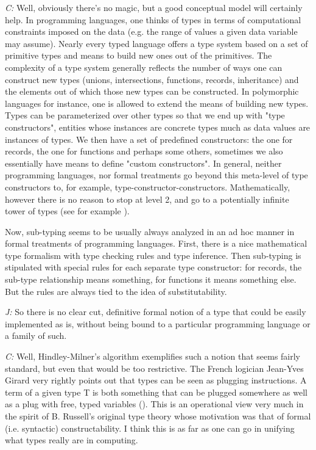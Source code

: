 \documentclass[10pt]{sigplanconf}
\begin{document}
\emph{C:} Well, obviously there's no magic, but a good conceptual model will certainly help. In programming languages, one thinks of types in terms of computational constraints imposed on the data (e.g. the range of values a given data variable may assume). Nearly every typed language offers a type system based on a set of primitive types and means to build new ones out of the primitives. The complexity of a type system generally reflects the number of ways one can construct new types (unions, intersections, functions, records, inheritance) and the elements out of which those new types can be constructed. In polymorphic languages for instance, one is allowed to extend the means of building new types. Types can be parameterized over other types so that we end up with "type constructors", entities whose instances are concrete types much as data values are instances of types. We then have a set of predefined constructors: the one for records, the one for functions and perhaps some others, sometimes we also essentially have means to define "custom constructors". In general, neither programming languages, nor formal treatments go beyond this meta-level of type constructors to, for example, type-constructor-constructors. Mathematically, however there is no reason to stop at level 2, and go to a potentially infinite tower of types (see for example \cite{sheard}).

Now, sub-typing seems to be usually always analyzed in an ad hoc manner in formal treatments of programming languages. First, there is a nice mathematical type formalism with type checking rules and type inference. Then sub-typing is stipulated with special rules for each separate type constructor: for records, the sub-type relationship means something, for functions it means something else. But the rules are always tied to the idea of substitutability.

\emph{J:} So there is no clear cut, definitive formal notion of a type that could be easily implemented as is, without being bound to a particular programming language or a family of such.

\emph{C:} Well, Hindley-Milner's algorithm exemplifies such a notion that seems fairly standard, but even that would be too restrictive. The French logician Jean-Yves Girard very rightly points out that types can be seen as plugging instructions. A term of a given type T is both something that can be plugged somewhere as well as a plug with free, typed variables (\cite{girard}). This is an operational view very much in the spirit of B. Russell's original type theory whose motivation was that of formal (i.e. syntactic) constructability.  I think this is as far as one can go in unifying what types really are in computing.
\end{document}
